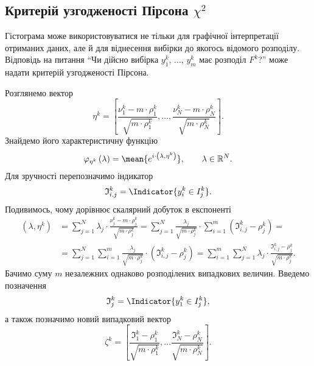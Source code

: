 \subsection{Критерій узгодженості Пірсона $\chi^2$}
Гістограма може використовуватися не тільки для графічної інтерпретації
отриманих даних, але й для віднесення вибірки до якогось відомого розподілу.
Відповідь на питання ``Чи дійсно вибірка $y_1^k$, $\dots$, $y_m^k$ має розподіл
$F^k$?'' може надати критерій узгодженості Пірсона.

Розглянемо вектор
\begin{equation*}
    \eta^k
    = \left[ \frac{\nu_1^k - m \cdot \rho_1^k}{\sqrt{m \cdot \rho_1^k}}, \dots,
      \frac{\nu_N^k - m \cdot \rho_N^k}{\sqrt{m \cdot \rho_N^k}} \right].
\end{equation*}
Знайдемо його характеристичну функцію
\begin{equation*}
  \varphi_{\eta^k}\left( \lambda\right)
  = \mean{e^{i \cdot \left( \lambda, \eta^k \right)}},\qquad
  \lambda \in \mathbb{R}^N.
\end{equation*}
Для зручності перепозначимо індикатор
\begin{equation*}
  \mathfrak{I}_{i,j}^k = \Indicator{y_i^k \in I_j^k}.
\end{equation*}
Подивимось, чому дорівнює скалярний добуток в експоненті
\begin{equation*}
  \begin{split}
    \left( \lambda, \eta^k \right)
    &= \sum_{j=1}^{N} \lambda_j \cdot \frac{\nu_j^k - m \cdot \rho_j^k}{
      \sqrt{m \cdot \rho_j^k}}
    = \sum_{j=1}^{N}\frac{\lambda_j}{\sqrt{m \cdot \rho_j^k}}
      \cdot \sum_{i=1}^{m}\left( \mathfrak{I}_{i,j}^k - \rho_j^k \right) = \\
    &= \sum_{j=1}^{N} \sum_{i=1}^{m}
      \frac{\lambda_j}{\sqrt{m \cdot \rho_j^k}}
      \cdot \left( \mathfrak{I}_{i,j}^k - \rho_j^k \right)
    = \sum_{i=1}^{m} \sum_{j=1}^{N} \lambda_j \cdot
      \frac{\mathfrak{I}_{i,j}^k - \rho_j^k}{\sqrt{m \cdot \rho_j^k}}.
  \end{split}
\end{equation*}
Бачимо суму $m$ незалежних однаково розподілених випадкових величин.
Введемо позначення
\begin{equation*}
  \mathfrak{I}_j^k = \Indicator{y_1^k \in I_j^k},
\end{equation*}
а також позначимо новий випадковий вектор
\begin{equation*}
  \zeta^k
  = \left[ \frac{\mathfrak{I}_1^k - \rho_1^k}{\sqrt{m \cdot \rho_1^k}},
    \dots
    \frac{\mathfrak{I}_N^k - \rho_N^k}{\sqrt{m \cdot \rho_N^k}} \right].
\end{equation*}
